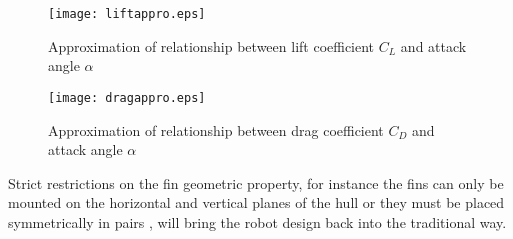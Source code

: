 \begin{figure}
\centering
\texttt{[image: liftappro.eps]}
\caption{Approximation of relationship between lift coefficient $C_{L}$ and attack angle $\alpha$}	
\label{FIG:LiftApprox}
\end{figure}
\begin{figure}
\centering
\texttt{[image: dragappro.eps]}
\caption{Approximation of relationship between drag coefficient $C_{D}$ and attack angle $\alpha$}	
\label{FIG:DragApprox}
\end{figure}
Strict restrictions on the fin geometric property, for instance the fins can only be mounted on the horizontal and vertical planes of the hull or they must be placed symmetrically in pairs , will bring the robot design back into the traditional way. 

